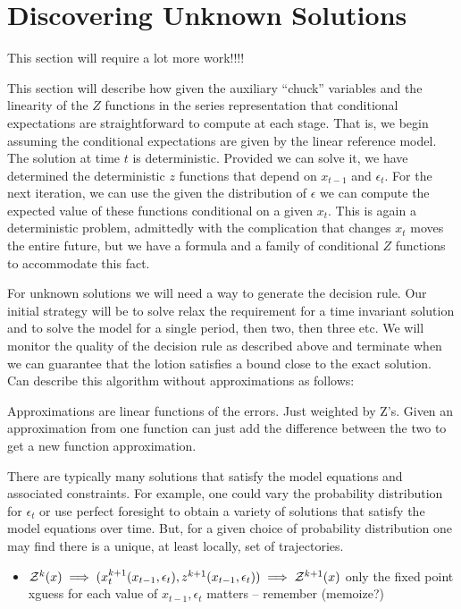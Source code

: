 \documentclass[12pt]{article}
\begin{document}
\section{Discovering Unknown Solutions}
\label{sec:unknown-solutions}

This section will require a lot more work!!!!

This section will describe how given the auxiliary ``chuck'' variables
and the linearity of the $Z$ functions in the series representation
that conditional expectations are straightforward to compute at each stage.
That is, we begin assuming the conditional expectations are given by the
linear reference model.  The solution at time $t$ is deterministic.
Provided we can solve it, we have determined the deterministic $z$ functions
that depend on $x_{t-1}$ and $\epsilon_t$.  For the next iteration,
we can use the given the distribution of $\epsilon$
we can compute the expected value
of these functions conditional on a given $x_t$.  This is again a deterministic
problem, admittedly with the complication that changes
$x_t$ moves the entire future, but we have a formula and a family of conditional
$Z$ functions to accommodate this fact. 


For unknown solutions we will need a way to generate the decision rule.  
Our initial strategy will be to solve 
relax the requirement for a time invariant solution and to solve
the model for a single period, then two, then three etc. We will monitor the
quality of the decision rule as described above and terminate when we 
can guarantee that the lotion satisfies a bound close to the exact solution.
Can describe this algorithm without approximations as follows:


Approximations are linear functions of the errors.  Just weighted by Z's.
Given an approximation from one function can just add the difference between the two  to get a new function approximation.



There are typically many solutions that satisfy the model equations and associated constraints.  For example, one could vary the probability distribution for $\epsilon_t$ or use perfect foresight to obtain a variety of solutions that
satisfy the model equations over time. But, for a given choice of probability distribution one may find there is a unique, at least locally, set of trajectories.


\begin{itemize}
\item $\mathcal{Z}^k(x) \implies (x^{k+1}_t(x_{t-1},\epsilon_t),z^{k+1}(x_{t-1},\epsilon_t)) \implies \mathcal{Z}^{k+1}(x)$  only the fixed point xguess for each value of $x_{t-1},\epsilon_t$ matters -- remember (memoize?)
\end{itemize}
\end{document}
